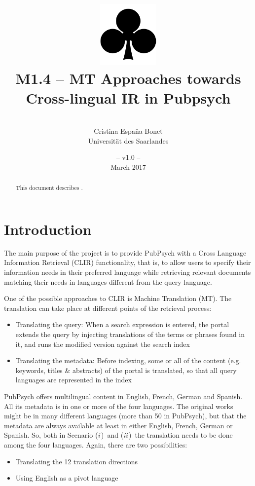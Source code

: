 \documentclass[a4paper,11pt]{article}
\title{
\includegraphics[width=3cm]{./img/200px-SuitClubs.png} \\
\Huge M1.4 -- MT Approaches towards Cross-lingual IR in Pubpsych}
\author{\vspace*{1cm}\\ \LARGE Cristina Espa\~na-Bonet \medskip \\ \Large Universit\"at des Saarlandes}
\date{\vspace*{2cm} -- v1.0 --\\March 2017}
\newcommand{\Ni}{({\em i\,})~}
\newcommand{\Nii}{({\em ii\,})~}
\begin{document}
\clearpage\maketitle
\thispagestyle{empty}\thispagestyle{empty}

\vspace*{5cm}
\begin{abstract}
This document describes . 
\end{abstract}

\newpage
\tableofcontents
\clearpage


\section{Introduction}
\label{s:intro}

The main purpose of the project is to provide PubPsych with a Cross Language Information Retrieval (CLIR) functionality, that is, to allow users to specify their information needs in their preferred language while retrieving relevant documents matching their needs in languages different from the query language.

One of the possible approaches to CLIR is Machine Translation (MT). The translation can take place at different points of the retrieval process:
\begin{itemize}
\itemsep0em 
 \item[\Ni] Translating the query: When a search expression is entered, the portal extends the query by injecting translations of the terms or phrases found in it, and runs the modified version against the search index
 \item[\Nii] Translating the metadata: Before indexing, some or all of the content (e.g. keywords, titles \& abstracts) of the portal is translated, so that all query languages are represented in the index
\end{itemize}

PubPsych offers multilingual content in English, French, German and Spanish. All its metadata is in one or more of the four languages. The original works might be in many different languages (more than 50 in PubPsych), but that the metadata are always available at least in either English, French, German or Spanish. So, both in Scenario \Ni and \Nii the translation needs to be done among the four languages. Again, there are two possibilities:
\begin{itemize}
\itemsep0em 
 \item[\Ni] Translating the 12 translation directions
 \item[\Nii] Using English as a pivot language
\end{itemize}
\end{document}
